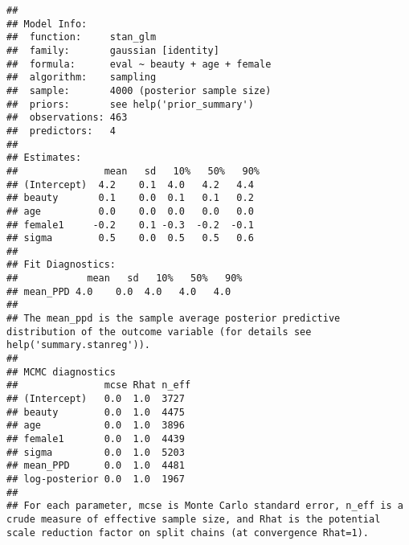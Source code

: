 \documentclass[
]{article}
\begin{document}
\begin{verbatim}
## 
## Model Info:
##  function:     stan_glm
##  family:       gaussian [identity]
##  formula:      eval ~ beauty + age + female
##  algorithm:    sampling
##  sample:       4000 (posterior sample size)
##  priors:       see help('prior_summary')
##  observations: 463
##  predictors:   4
## 
## Estimates:
##               mean   sd   10%   50%   90%
## (Intercept)  4.2    0.1  4.0   4.2   4.4 
## beauty       0.1    0.0  0.1   0.1   0.2 
## age          0.0    0.0  0.0   0.0   0.0 
## female1     -0.2    0.1 -0.3  -0.2  -0.1 
## sigma        0.5    0.0  0.5   0.5   0.6 
## 
## Fit Diagnostics:
##            mean   sd   10%   50%   90%
## mean_PPD 4.0    0.0  4.0   4.0   4.0  
## 
## The mean_ppd is the sample average posterior predictive distribution of the outcome variable (for details see help('summary.stanreg')).
## 
## MCMC diagnostics
##               mcse Rhat n_eff
## (Intercept)   0.0  1.0  3727 
## beauty        0.0  1.0  4475 
## age           0.0  1.0  3896 
## female1       0.0  1.0  4439 
## sigma         0.0  1.0  5203 
## mean_PPD      0.0  1.0  4481 
## log-posterior 0.0  1.0  1967 
## 
## For each parameter, mcse is Monte Carlo standard error, n_eff is a crude measure of effective sample size, and Rhat is the potential scale reduction factor on split chains (at convergence Rhat=1).
\end{verbatim}
\end{document}
